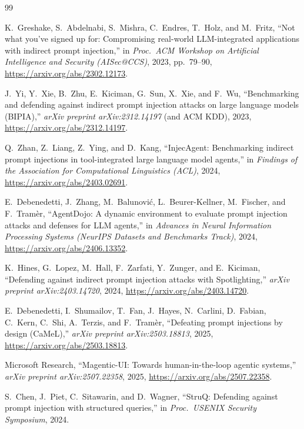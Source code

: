 \documentclass[10pt,twocolumn,letterpaper]{article}
\begin{document}
\footnotesize
\begin{thebibliography}{99}

K.~Greshake, S.~Abdelnabi, S.~Mishra, C.~Endres, T.~Holz, and M.~Fritz, ``Not what you've signed up for: Compromising real-world LLM-integrated applications with indirect prompt injection,'' in \emph{Proc.\ ACM Workshop on Artificial Intelligence and Security (AISec@CCS)}, 2023, pp.~79--90, \url{https://arxiv.org/abs/2302.12173}.

J.~Yi, Y.~Xie, B.~Zhu, E.~Kiciman, G.~Sun, X.~Xie, and F.~Wu, ``Benchmarking and defending against indirect prompt injection attacks on large language models (BIPIA),'' \emph{arXiv preprint arXiv:2312.14197} (and ACM KDD), 2023, \url{https://arxiv.org/abs/2312.14197}.

Q.~Zhan, Z.~Liang, Z.~Ying, and D.~Kang, ``InjecAgent: Benchmarking indirect prompt injections in tool-integrated large language model agents,'' in \emph{Findings of the Association for Computational Linguistics (ACL)}, 2024, \url{https://arxiv.org/abs/2403.02691}.

E.~Debenedetti, J.~Zhang, M.~Balunovi\'{c}, L.~Beurer-Kellner, M.~Fischer, and F.~Tram\`{e}r, ``AgentDojo: A dynamic environment to evaluate prompt injection attacks and defenses for LLM agents,'' in \emph{Advances in Neural Information Processing Systems (NeurIPS Datasets and Benchmarks Track)}, 2024, \url{https://arxiv.org/abs/2406.13352}.

K.~Hines, G.~Lopez, M.~Hall, F.~Zarfati, Y.~Zunger, and E.~Kiciman, ``Defending against indirect prompt injection attacks with Spotlighting,'' \emph{arXiv preprint arXiv:2403.14720}, 2024, \url{https://arxiv.org/abs/2403.14720}.

E.~Debenedetti, I.~Shumailov, T.~Fan, J.~Hayes, N.~Carlini, D.~Fabian, C.~Kern, C.~Shi, A.~Terzis, and F.~Tram\`{e}r, ``Defeating prompt injections by design (CaMeL),'' \emph{arXiv preprint arXiv:2503.18813}, 2025, \url{https://arxiv.org/abs/2503.18813}.

Microsoft Research, ``Magentic-UI: Towards human-in-the-loop agentic systems,'' \emph{arXiv preprint arXiv:2507.22358}, 2025, \url{https://arxiv.org/abs/2507.22358}.

S.~Chen, J.~Piet, C.~Sitawarin, and D.~Wagner, ``StruQ: Defending against prompt injection with structured queries,'' in \emph{Proc.\ USENIX Security Symposium}, 2024.


\end{thebibliography}
\end{document}
